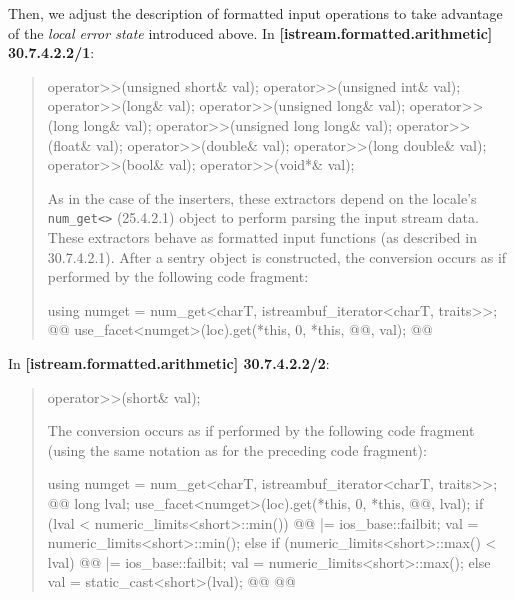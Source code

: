 \documentclass{wg21}
\begin{document}
Then, we adjust the description of formatted input operations to take advantage
of the \textit{local error state} introduced above. In \textbf{[istream.formatted.arithmetic]
30.7.4.2.2/1}:
\begin{quote}
\begin{codeblock}
operator>>(unsigned short& val);
operator>>(unsigned int& val);
operator>>(long& val);
operator>>(unsigned long& val);
operator>>(long long& val);
operator>>(unsigned long long& val);
operator>>(float& val);
operator>>(double& val);
operator>>(long double& val);
operator>>(bool& val);
operator>>(void*& val);
\end{codeblock}
As in the case of the inserters, these extractors depend on the locale's
\texttt{num_get<>} (25.4.2.1) object to perform parsing the input stream data.
These extractors behave as formatted input functions (as described in 30.7.4.2.1).
After a sentry object is constructed, the conversion occurs as if performed by
the following code fragment:

\begin{codeblock}
  using numget = num_get<charT, istreambuf_iterator<charT, traits>>;
  @@
  use_facet<numget>(loc).get(*this, 0, *this, @@, val);
  @@
\end{codeblock}
\end{quote}

In \textbf{[istream.formatted.arithmetic] 30.7.4.2.2/2}:
\begin{quote}
\begin{codeblock}
operator>>(short& val);
\end{codeblock}
The conversion occurs as if performed by the following code fragment (using the
same notation as for the preceding code fragment):
\begin{codeblock}
  using numget = num_get<charT, istreambuf_iterator<charT, traits>>;
  @@
  long lval;
  use_facet<numget>(loc).get(*this, 0, *this, @@, lval);
  if (lval < numeric_limits<short>::min()) {
    @@ |= ios_base::failbit;
    val = numeric_limits<short>::min();
  } else if (numeric_limits<short>::max() < lval) {
    @@ |= ios_base::failbit;
    val = numeric_limits<short>::max();
  }  else
    val = static_cast<short>(lval);
  @\added{\}}@
  @@
\end{codeblock}
\end{quote}
\end{document}
